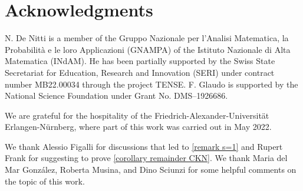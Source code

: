 \documentclass[10pt, reqno]{amsart}
\theoremstyle{plain}
\theoremstyle{remark}
\theoremstyle{definition}
\numberwithin{equation}{section}
\theoremstyle{plain}
\begin{document}
\vspace{0.5cm}
\section*{Acknowledgments}
N. De Nitti is a member of the Gruppo Nazionale per l'Analisi Matematica, la Probabilità e le loro Applicazioni (GNAMPA) of the Istituto Nazionale di Alta Matematica (INdAM). He has been partially supported by the Swiss State Secretariat for Education, Research and Innovation (SERI) under contract number MB22.00034 through the project TENSE. F. Glaudo is supported by the National Science Foundation under Grant No. DMS–1926686.

We are grateful for the hospitality of the Friedrich-Alexander-Universität Erlangen-Nürnberg, where part of this work was carried out in May 2022.

We thank Alessio Figalli for discussions that led to \cref{remark s=1} and Rupert Frank for suggesting to prove \cref{corollary remainder CKN}.
We thank Maria del Mar González, Roberta Musina, and Dino Sciunzi for some helpful comments on the topic of this work.  

\vspace{0.5cm}

\printbibliography

\vfill 
\end{document}
